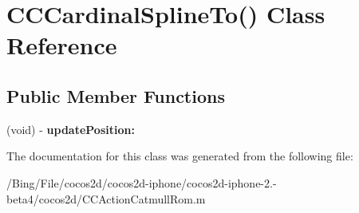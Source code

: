 \hypertarget{interface_c_c_cardinal_spline_to_07_08}{\section{C\-C\-Cardinal\-Spline\-To() Class Reference}
\label{interface_c_c_cardinal_spline_to_07_08}
}
\subsection*{Public Member Functions}
\begin{DoxyCompactItemize}
\item 
\hypertarget{interface_c_c_cardinal_spline_to_07_08_a16e91bbde0723dcbb1e1e8c2160c9392}{(void) -\/ {\bfseries update\-Position\-:}}\label{interface_c_c_cardinal_spline_to_07_08_a16e91bbde0723dcbb1e1e8c2160c9392}

\end{DoxyCompactItemize}


The documentation for this class was generated from the following file\-:\begin{DoxyCompactItemize}
\item 
/\-Bing/\-File/cocos2d/cocos2d-\/iphone/cocos2d-\/iphone-\/2.-\/beta4/cocos2d/C\-C\-Action\-Catmull\-Rom.\-m\end{DoxyCompactItemize}
